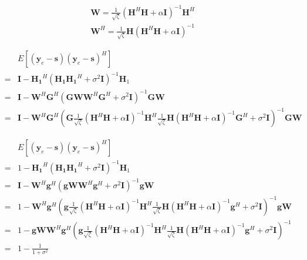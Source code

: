 \documentclass[12pt,journal,draftclsnofoot,onecolumn]{IEEEtran}
\begin{document}
\begin{eqnarray}
\mathbf{W} = \frac{1}{\sqrt{\zeta}}\left(\mathbf{H}^H\mathbf{H} + \alpha\mathbf{I}\right)^{-1}\mathbf{H}^H
\end{eqnarray}
\begin{eqnarray}
\mathbf{W}^H = \frac{1}{\sqrt{\zeta}}\mathbf{H}\left(\mathbf{H}^H\mathbf{H} + \alpha\mathbf{I}\right)^{-1}
\end{eqnarray}

\begin{eqnarray}
&&E[(\mathbf{y}_e - \mathbf{s})(\mathbf{y}_e - \mathbf{s})^H]\\
&=&\mathbf{I} - \mathbf{H_1}^H(\mathbf{H_1}\mathbf{H_1}^H + \sigma^2\mathbf{I})^{-1}\mathbf{H}_1\\
&=&\mathbf{I} - \mathbf{W}^H\mathbf{G}^H(\mathbf{G}\mathbf{W}\mathbf{W}^H\mathbf{G}^H + \sigma^2\mathbf{I})^{-1}\mathbf{G}\mathbf{W}\\
&=&\mathbf{I} - \mathbf{W}^H\mathbf{G}^H(\mathbf{G} \frac{1}{\sqrt{\zeta}}\left(\mathbf{H}^H\mathbf{H} + \alpha\mathbf{I}\right)^{-1}\mathbf{H}^H\frac{1}{\sqrt{\zeta}}\mathbf{H}\left(\mathbf{H}^H\mathbf{H} + \alpha\mathbf{I}\right)^{-1}\mathbf{G}^H + \sigma^2\mathbf{I})^{-1}\mathbf{G}\mathbf{W}
\end{eqnarray}

\begin{eqnarray}
	&&E[(\mathbf{y}_e - \mathbf{s})(\mathbf{y}_e - \mathbf{s})^H]\\
	&=&1 - \mathbf{H_1}^H(\mathbf{H_1}\mathbf{H_1}^H + \sigma^2\mathbf{I})^{-1}\mathbf{H}_1\\
	&=&\mathbf{I} - \mathbf{W}^H\mathbf{g}^H(\mathbf{g}\mathbf{W}\mathbf{W}^H\mathbf{g}^H + \sigma^2\mathbf{I})^{-1}\mathbf{g}\mathbf{W}\\
	&=&1 - \mathbf{W}^H\mathbf{g}^H(\mathbf{g} \frac{1}{\sqrt{\zeta}}\left(\mathbf{H}^H\mathbf{H} + \alpha\mathbf{I}\right)^{-1}\mathbf{H}^H\frac{1}{\sqrt{\zeta}}\mathbf{H}\left(\mathbf{H}^H\mathbf{H} + \alpha\mathbf{I}\right)^{-1}\mathbf{g}^H + \sigma^2\mathbf{I})^{-1}\mathbf{g}\mathbf{W}\\
	&=&1- \mathbf{g}\mathbf{W}\mathbf{W}^H\mathbf{g}^H(\mathbf{g} \frac{1}{\sqrt{\zeta}}\left(\mathbf{H}^H\mathbf{H} + \alpha\mathbf{I}\right)^{-1}\mathbf{H}^H\frac{1}{\sqrt{\zeta}}\mathbf{H}\left(\mathbf{H}^H\mathbf{H} + \alpha\mathbf{I}\right)^{-1}\mathbf{g}^H + \sigma^2\mathbf{I})^{-1}\\
	&=&1- \frac{1}{1 + \sigma^2}
\end{eqnarray}
\end{document}
